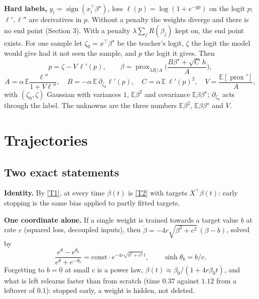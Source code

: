 \documentclass[10pt]{article}
\newcommand{\bs}{\beta^\star}\newcommand{\E}{\mathbb E}\newcommand{\asinh}{\operatorname{arcsinh}}\newcommand{\prox}{\operatorname{prox}}
\begin{document}
\textbf{Hard labels,} $y_i=\operatorname{sign}(x_i^\top\bs)$, loss $\ell(p)=\log(1+e^{-yp})$ on the logit $p$; $\ell',\ell''$ are derivatives in $p$. Without a penalty the weights diverge and there is no end point (Section 3). With a penalty $\lambda\sum_jR(\beta_j)$ kept on, the end point exists. For one sample let $\zeta_0=x^\top\bs$ be the teacher's logit, $\zeta$ the logit the model would give had it not seen the sample, and $p$ the logit it gives. Then
\begin{equation}\label{hp}
p=\zeta-V\,\ell'(p),\qquad\beta=\prox_{\lambda R/A}\!\Big(\frac{B\bs+\sqrt C\,h}{A}\Big),
\end{equation}
\[
A=\alpha\,\E\frac{\ell''}{1+V\ell''},\quad B=-\alpha\,\E\,\partial_{\zeta_0}\ell'(p),\quad C=\alpha\,\E\,\ell'(p)^2,\quad V=\frac{\E[\prox{}']}{A},
\]
with $(\zeta_0,\zeta)$ Gaussian with variances $1$, $\E\beta^2$ and covariance $\E\beta\bs$; $\partial_{\zeta_0}$ acts through the label. The unknowns are the three numbers $\E\beta^2$, $\E\beta\bs$ and $V$.

\section{Trajectories}
\subsection{Two exact statements}
\textbf{Identity.} By \eqref{T1}, at every time $\beta(t)$ is \eqref{T2} with targets $X^\top\beta(t)$: early stopping is the same bias applied to partly fitted targets.

\textbf{One coordinate alone.} If a single weight is trained towards a target value $b$ at rate $r$ (squared loss, decoupled inputs), then $\dot\beta=-4r\sqrt{\beta^2+c^2}\,(\beta-b)$, solved by
\begin{equation}
\frac{e^{\theta}-e^{\theta_b}}{e^{\theta}+e^{-\theta_b}}=\text{const}\cdot e^{-4r\sqrt{b^2+c^2}\,t},\qquad\sinh\theta_b=b/c .
\end{equation}
Forgetting to $b=0$ at small $c$ is a power law, $\beta(t)\approx\beta_0/(1+4r\beta_0t)$, and what is left relearns faster than from scratch (time $0.37$ against $1.12$ from a leftover of $0.1$): stopped early, a weight is hidden, not deleted.
\end{document}
